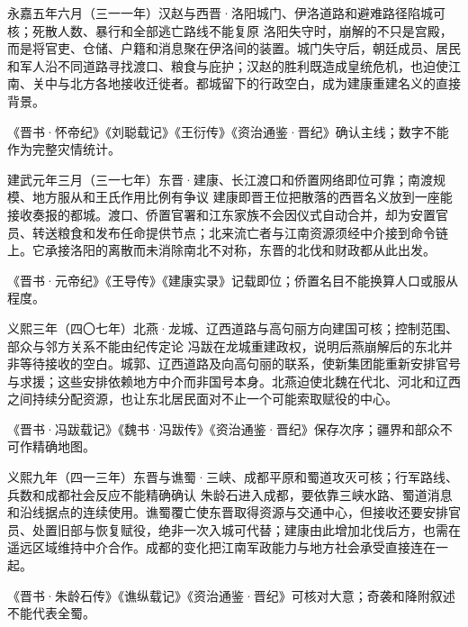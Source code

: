 \begin{event}{}{永嘉五年六月（三一一年）}{汉赵与西晋·洛阳城门、伊洛道路和避难路径}{陷城可核；死散人数、暴行和全部逃亡路线不能复原}
洛阳失守时，崩解的不只是宫殿，而是将官吏、仓储、户籍和消息聚在伊洛间的装置。城门失守后，朝廷成员、居民和军人沿不同道路寻找渡口、粮食与庇护；汉赵的胜利既造成皇统危机，也迫使江南、关中与北方各地接收迁徙者。都城留下的行政空白，成为建康重建名义的直接背景。

《晋书·怀帝纪》《刘聪载记》《王衍传》《资治通鉴·晋纪》确认主线；数字不能作为完整灾情统计。
\end{event}

\begin{event}{}{建武元年三月（三一七年）}{东晋·建康、长江渡口和侨置网络}{即位可靠；南渡规模、地方服从和王氏作用比例有争议}
建康即晋王位把散落的西晋名义放到一座能接收奏报的都城。渡口、侨置官署和江东家族不会因仪式自动合并，却为安置官员、转送粮食和发布任命提供节点；北来流亡者与江南资源须经中介接到命令链上。它承接洛阳的离散而未消除南北不对称，东晋的北伐和财政都从此出发。

《晋书·元帝纪》《王导传》《建康实录》记载即位；侨置名目不能换算人口或服从程度。
\end{event}

\begin{event}{}{义熙三年（四〇七年）}{北燕·龙城、辽西道路与高句丽方向}{建国可核；控制范围、部众与邻方关系不能由纪传定论}
冯跋在龙城重建政权，说明后燕崩解后的东北并非等待接收的空白。城郭、辽西道路及向高句丽的联系，使新集团能重新安排官号与求援；这些安排依赖地方中介而非国号本身。北燕迫使北魏在代北、河北和辽西之间持续分配资源，也让东北居民面对不止一个可能索取赋役的中心。

《晋书·冯跋载记》《魏书·冯跋传》《资治通鉴·晋纪》保存次序；疆界和部众不可作精确地图。
\end{event}

\begin{event}{}{义熙九年（四一三年）}{东晋与谯蜀·三峡、成都平原和蜀道}{攻灭可核；行军路线、兵数和成都社会反应不能精确确认}
朱龄石进入成都，要依靠三峡水路、蜀道消息和沿线据点的连续使用。谯蜀覆亡使东晋取得资源与交通中心，但接收还要安排官员、处置旧部与恢复赋役，绝非一次入城可代替；建康由此增加北伐后方，也需在遥远区域维持中介合作。成都的变化把江南军政能力与地方社会承受直接连在一起。

《晋书·朱龄石传》《谯纵载记》《资治通鉴·晋纪》可核对大意；奇袭和降附叙述不能代表全蜀。
\end{event}


